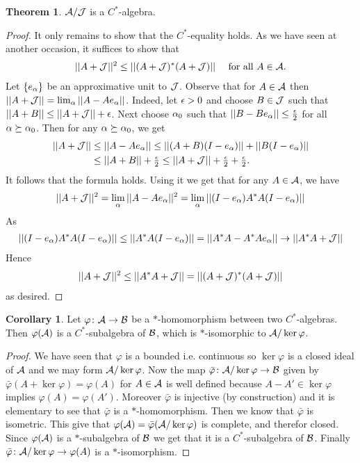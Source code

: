 \documentclass[10pt,english,a4paper]{article}
\theoremstyle{definition}
\newtheorem*{theorem}{Theorem}
\newtheorem*{corollary}{Corollary}
\begin{document}
\begin{theorem}
    $\mathcal{A} /\mathcal{J}$ is a $C^*$-algebra.
\end{theorem}
\begin{proof}
    It only remains to show that the $C^*$-equality holds. As we have seen at
another occasion, it suffices to show that 
\begin{align*}
    ||A+\mathcal{J}||^2 \leq ||(A + \mathcal{J})^*(A+ \mathcal{J})||\quad \text{ for all } A \in \mathcal{A}.
\end{align*}
Let $\{e_{\alpha}\}$ be an approximative unit to $\mathcal{J}$. Observe that for 
$A \in \mathcal{A}$ then $||A + \mathcal{J}|| = \lim_{\alpha}||A-Ae_{\alpha}||$. 
Indeed, let $\epsilon > 0$ and choose $B \in \mathcal{J}$ such that 
$||A+B|| \leq ||A+\mathcal{J}|| + \epsilon$. Next choose $\alpha_0$ such that 
$||B-Be_{\alpha}|| \leq \tfrac{\epsilon}{2}$ for all $\alpha \succeq \alpha_0$. 
Then for any $\alpha \succeq \alpha_0$, we get
\begin{align*}
    ||A+\mathcal{J}|| &\leq ||A-Ae_{\alpha}|| \leq ||(A+B)(I-e_{\alpha})|| + ||B(I-e_{\alpha})|| \\
&\leq ||A+B|| + \tfrac{\epsilon}{2} \leq ||A+\mathcal{J}|| + \tfrac{\epsilon}{2}+ \tfrac{\epsilon}{2}.
\end{align*}
It follows that the formula holds. Using it we get that for any $A \in \mathcal{A}$,
we have
\begin{align*}
    ||A+\mathcal{J}||^2 &= \lim_{\alpha} ||A-Ae_{\alpha}||^2 = \lim_{\alpha} ||(I-e_{\alpha})A^*A (I-e_{\alpha})||\\
\end{align*}
As
\begin{align*}
    ||(I-e_{\alpha})A^*A (I-e_{\alpha})|| \leq ||A^*A (I-e_{\alpha})|| = ||A^*A-A^*Ae_{\alpha}|| \to || A^*A + \mathcal{J}|| 
\end{align*}
Hence 
\begin{align*}
||A + \mathcal{J}||^2 \leq ||A^*A + \mathcal{J}|| = ||(A + \mathcal{J})^*(A+\mathcal{J})||
\end{align*}
as desired. 
\end{proof}


\begin{corollary}
    Let $\varphi \colon \mathcal{A} \to \mathcal{B}$ be a $*$-homomorphism between two 
$C^*$-algebras. Then $\varphi(\mathcal{A})$ is a $C^*$-subalgebra of $\mathcal{B}$, which 
is $*$-isomorphic to $\mathcal{A} /\ker \varphi$. 
\end{corollary}
\begin{proof}
    We have seen that $\varphi$ is a bounded i.e. continuous so $\ker\varphi$
is a closed ideal of $\mathcal{A}$ and we may form $\mathcal{A}/\ker\varphi$.
Now the map $\bar{\varphi}\colon \mathcal{A}/\ker\varphi \to \mathcal{B}$ given by
$\bar{\varphi}(A + \ker\varphi) = \varphi(A)$ for $A \in \mathcal{A}$ is 
well defined because $A-A' \in \ker\varphi$ implies 
$\varphi(A) = \varphi(A')$.
Moreover $\bar{\varphi}$ is injective (by construction) and 
it is elementary to see that $\bar{\varphi}$ is a $*$-homomorphism. 
Then we know that $\bar{\varphi}$ is isometric. This give that 
$\varphi(\mathcal{A}) = \bar{\varphi} (\mathcal{A}/\ker\varphi)$ is complete, 
and therefor closed. Since $\varphi(\mathcal{A})$ is a $*$-subalgebra of $\mathcal{B}$ we
get that it is a $C^*$-subalgebra of $\mathcal{B}$. 
Finally $\bar{\varphi}\colon \mathcal{A}/\ker\varphi \to \varphi (A)$
is a $*$-isomorphism.
\end{proof}
\end{document}
